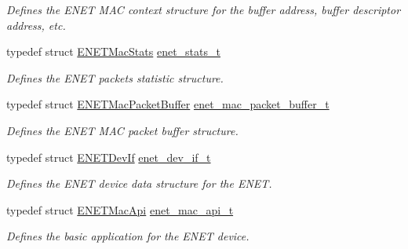 \begin{DoxyCompactItemize}
\begin{DoxyCompactList}\small\item\em Defines the E\+N\+ET M\+AC context structure for the buffer address, buffer descriptor address, etc. \end{DoxyCompactList}\item 
typedef struct \hyperlink{structENETMacStats}{E\+N\+E\+T\+Mac\+Stats} \hyperlink{group__enet__driver_ga5d6f968c08a760dbdb9aad842cefeb00}{enet\+\_\+stats\+\_\+t}\hypertarget{group__enet__driver_ga5d6f968c08a760dbdb9aad842cefeb00}{}\label{group__enet__driver_ga5d6f968c08a760dbdb9aad842cefeb00}

\begin{DoxyCompactList}\small\item\em Defines the E\+N\+ET packets statistic structure. \end{DoxyCompactList}\item 
typedef struct \hyperlink{structENETMacPacketBuffer}{E\+N\+E\+T\+Mac\+Packet\+Buffer} \hyperlink{group__enet__driver_gac8cd75bf78539c0237a1895b5b573557}{enet\+\_\+mac\+\_\+packet\+\_\+buffer\+\_\+t}\hypertarget{group__enet__driver_gac8cd75bf78539c0237a1895b5b573557}{}\label{group__enet__driver_gac8cd75bf78539c0237a1895b5b573557}

\begin{DoxyCompactList}\small\item\em Defines the E\+N\+ET M\+AC packet buffer structure. \end{DoxyCompactList}\item 
typedef struct \hyperlink{structENETDevIf}{E\+N\+E\+T\+Dev\+If} \hyperlink{group__enet__driver_ga497f30fbc93952e93d9fb8cf78480b75}{enet\+\_\+dev\+\_\+if\+\_\+t}\hypertarget{group__enet__driver_ga497f30fbc93952e93d9fb8cf78480b75}{}\label{group__enet__driver_ga497f30fbc93952e93d9fb8cf78480b75}

\begin{DoxyCompactList}\small\item\em Defines the E\+N\+ET device data structure for the E\+N\+ET. \end{DoxyCompactList}\item 
typedef struct \hyperlink{structENETMacApi}{E\+N\+E\+T\+Mac\+Api} \hyperlink{group__enet__driver_gab382bcb745b2f90606d85802d007108e}{enet\+\_\+mac\+\_\+api\+\_\+t}\hypertarget{group__enet__driver_gab382bcb745b2f90606d85802d007108e}{}\label{group__enet__driver_gab382bcb745b2f90606d85802d007108e}

\begin{DoxyCompactList}\small\item\em Defines the basic application for the E\+N\+ET device. \end{DoxyCompactList}\end{DoxyCompactItemize}
